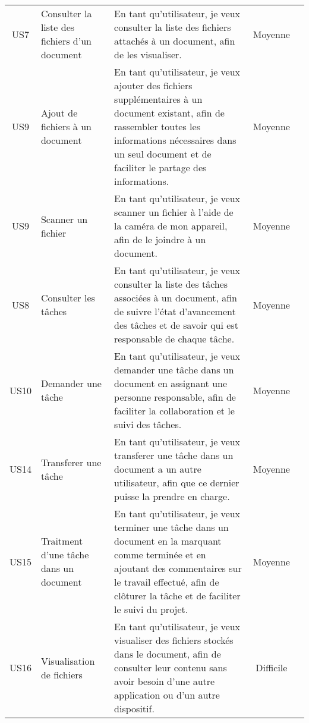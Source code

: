 \begin{landscape}
\begin{adjustwidth}{-1cm}{}
\begin{longtable}{|c|p{5cm}|p{12cm}|c|c|}
    \cline{1-4}
    
    US7&Consulter la liste des fichiers d'un document&En tant qu'utilisateur, je veux consulter la liste des fichiers attachés à un document, afin de les visualiser. &Moyenne&\\
    
    
    
    \cline{1-4}
    US9&Ajout de fichiers à un document&En tant qu'utilisateur, je veux ajouter des fichiers supplémentaires à un document existant, afin de rassembler toutes les informations nécessaires dans un seul document et de faciliter le partage des informations.&Moyenne&\\
    \cline{1-4}
    US9&Scanner un fichier&En tant qu'utilisateur, je veux scanner un fichier à l'aide de la caméra de mon appareil, afin de le joindre à un document.&Moyenne&\\
    \cline{1-4}

    US8&Consulter les tâches&En tant qu'utilisateur, je veux consulter la liste des tâches associées à un document, afin de suivre l'état d'avancement des tâches et de savoir qui est responsable de chaque tâche. &Moyenne&\\
    \cline{1-4}
    US10&Demander une tâche&En tant qu’utilisateur, je veux demander une tâche dans un document en assignant une personne responsable, afin de faciliter la collaboration et le suivi des tâches.&Moyenne&\\
    
    \cline{1-4}
    US14&Transferer une tâche&En tant qu'utilisateur, je veux transferer une tâche dans un document a un autre utilisateur, afin que ce dernier puisse la prendre en charge.&Moyenne&\\
    \cline{1-4}
    US15&Traitment d'une tâche dans un document&En tant qu'utilisateur, je veux terminer une tâche dans un document en la marquant comme terminée et en ajoutant des commentaires sur le travail effectué, afin de clôturer la tâche et de faciliter le suivi du projet. &Moyenne&\\



    \cline{1-4}

    US16&Visualisation de fichiers&En tant qu'utilisateur, je veux visualiser des fichiers stockés dans le document, afin de consulter leur contenu sans avoir besoin d'une autre application ou d'un autre dispositif.&Difficile&\\


\end{longtable}
\end{adjustwidth}
\end{landscape}
